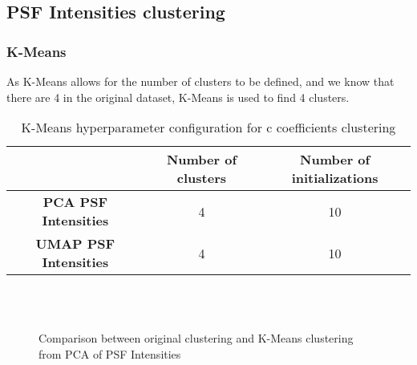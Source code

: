 	\subsection{PSF Intensities clustering}

		\subsubsection{K-Means}
			
			As K-Means allows for the number of clusters to be defined, and we know that there are 4 in the original dataset, K-Means is used to find 4 clusters.
			
			\begin{table}[h!]
				\centering
				\begin{tabular}{|c|c|c|}
					\hline
					& \textbf{Number of clusters} & \textbf{Number of initializations}\\
					\hline
					\textbf{PCA PSF Intensities} & 4 & 10\\
					\hline
					\textbf{UMAP PSF Intensities} & 4 & 10\\
					\hline
				\end{tabular}
				\caption{K-Means hyperparameter configuration for c coefficients clustering}
			\end{table}
		
			\begin{figure*}[ht!]
				\centering
				\hspace{\fill}
				\\
				\hspace{\fill}
				\\
					
				\hspace{\fill}
				\caption{Comparison between original clustering and K-Means clustering from PCA of PSF Intensities}
			\end{figure*}
			\FloatBarrier
			
